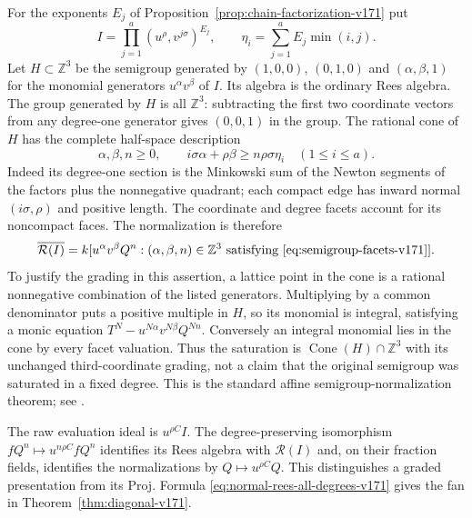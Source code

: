 For the exponents $E_j$ of Proposition~\ref{prop:chain-factorization-v171}
put
\[
 I=\prod_{j=1}^a(u^\rho,v^{j\sigma})^{E_j},\qquad
 \eta_i=\sum_{j=1}^aE_j\min(i,j).
\]
Let $H\subset\mathbb Z^3$ be the semigroup generated by $(1,0,0)$,
$(0,1,0)$ and $(\alpha,\beta,1)$ for the monomial generators
$u^\alpha v^\beta$ of $I$. Its algebra is the ordinary Rees algebra.
The group generated by $H$ is all $\mathbb Z^3$: subtracting the
first two coordinate vectors from any degree-one generator gives
$(0,0,1)$ in the group. The rational cone of $H$ has the complete
half-space description
\begin{equation}\label{eq:semigroup-facets-v171}
 \alpha,\beta,n\geq0,\qquad
 i\sigma\alpha+\rho\beta\geq n\rho\sigma\eta_i
       \quad(1\leq i\leq a).
\end{equation}
Indeed its degree-one section is the Minkowski sum of the Newton
segments of the factors plus the nonnegative quadrant; each compact
edge has inward normal $(i\sigma,\rho)$ and positive length.
The coordinate and degree facets account for its noncompact faces.
The normalization is therefore
\begin{equation}\label{eq:normal-rees-all-degrees-v171}
 \overline{\mathcal R(I)}
 =k[u^\alpha v^\beta Q^n:(\alpha,\beta,n)\in
                       \mathbb Z^3\text{ satisfying }
                       \eqref{eq:semigroup-facets-v171}].
\end{equation}
To justify the grading in this assertion, a lattice point in the cone
is a rational nonnegative combination of the listed generators.
Multiplying by a common denominator puts a positive multiple in
$H$, so its monomial is integral, satisfying a monic equation
$T^N-u^{N\alpha}v^{N\beta}Q^{Nn}$. Conversely an integral monomial
lies in the cone by every facet valuation. Thus the saturation is
$\operatorname{Cone}(H)\cap\mathbb Z^3$ with its unchanged third-coordinate
grading, not a claim that the original semigroup was saturated in a
fixed degree. This is the standard affine semigroup-normalization
theorem; see \cite[Chapters 1 and 5]{HunekeSwanson171}.

The raw evaluation ideal is $u^{\rho C}I$. The degree-preserving
isomorphism $fQ^n\mapsto u^{n\rho C}fQ^n$ identifies its Rees algebra
with $\mathcal R(I)$ and, on their fraction fields, identifies the
normalizations by $Q\mapsto u^{\rho C}Q$. This distinguishes a graded
presentation from its Proj. Formula \eqref{eq:normal-rees-all-degrees-v171}
gives the fan in Theorem~\ref{thm:diagonal-v171}.

